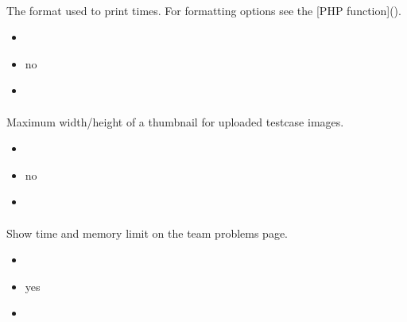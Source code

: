 \documentclass[a4paper,10pt,english,openany]{sphinxmanual}
\begin{document}
\paragraph{}
\label{\detokenize{configuration-reference:time-format}}
\sphinxAtStartPar
The format used to print times. For formatting options see the {[}PHP  function{]}().
\begin{itemize}
\item {} 
\sphinxAtStartPar
{} 

\item {} 
\sphinxAtStartPar
{} no

\item {} 
\sphinxAtStartPar
{} 

\end{itemize}


\paragraph{}
\label{\detokenize{configuration-reference:thumbnail-size}}
\sphinxAtStartPar
Maximum width/height of a thumbnail for uploaded testcase images.
\begin{itemize}
\item {} 
\sphinxAtStartPar
{} 

\item {} 
\sphinxAtStartPar
{} no

\item {} 
\sphinxAtStartPar
{} 

\end{itemize}


\paragraph{}
\label{\detokenize{configuration-reference:show-limits-on-team-page}}
\sphinxAtStartPar
Show time and memory limit on the team problems page.
\begin{itemize}
\item {} 
\sphinxAtStartPar
{} 

\item {} 
\sphinxAtStartPar
{} yes

\item {} 
\sphinxAtStartPar
{} 

\end{itemize}
\end{document}
